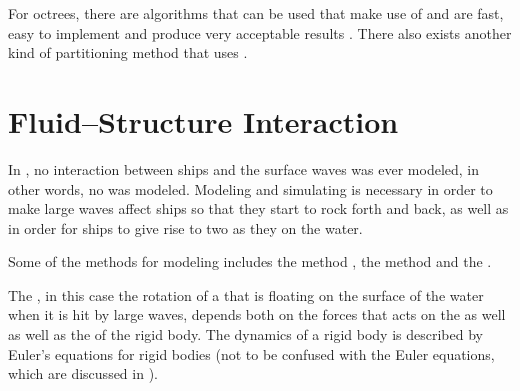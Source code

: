 For octrees, there are algorithms that can be used that make use of  and are fast, easy to implement and produce very acceptable results \citep{Valgaerts,Ji2012}. There also exists another kind of partitioning method that uses  \citep{Fuster2011,Agbaglah2011}.

\section{Fluid--Structure Interaction}

In \thisprojectwork, no interaction between ships and the surface waves was ever modeled, in other words, no \FSI was modeled. Modeling and simulating \FSI is necessary in order to make large waves affect ships so that they start to rock forth and back, as well as in order for ships to give rise to two  as they \sail on the water.
    
Some of the methods for modeling \FSI includes the \IB method \citep{Peskin2002,Ghias2007}, the \VOS method and the  \citep{Carlson2004}.

The , in this case the rotation of a \ship that is floating on the surface of the water when it is hit by large waves, depends both on the forces that acts on the  as well as well as the   of the rigid body. The dynamics of a rigid body is described by Euler's equations for rigid bodies (not to be confused with the Euler equations, which are discussed in ).



